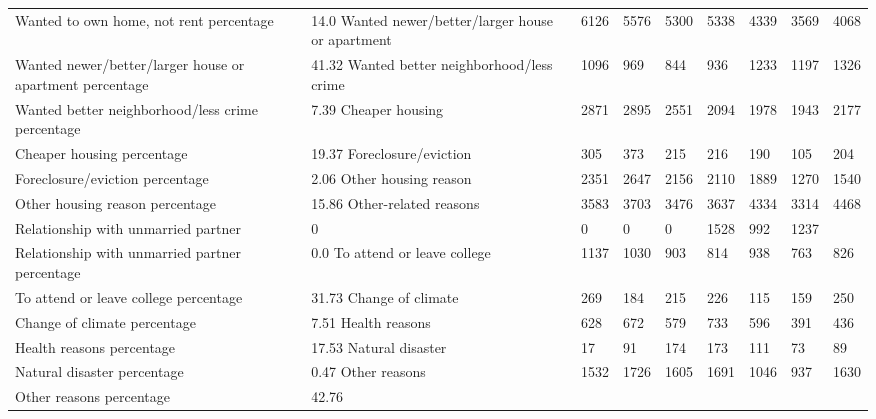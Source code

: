 \begin{tabular}{llllllll}
Wanted to own home, not rent percentage & 14.0%
Wanted newer/better/larger house or apartment & 6126 & 5576 & 5300 & 5338 & 4339 & 3569 & 4068 \\
Wanted newer/better/larger house or apartment percentage & 41.32%
Wanted better neighborhood/less crime & 1096 & 969 & 844 & 936 & 1233 & 1197 & 1326 \\
Wanted better neighborhood/less crime percentage & 7.39%
Cheaper housing & 2871 & 2895 & 2551 & 2094 & 1978 & 1943 & 2177 \\
Cheaper housing percentage & 19.37%
Foreclosure/eviction & 305 & 373 & 215 & 216 & 190 & 105 & 204 \\
Foreclosure/eviction percentage & 2.06%
Other housing reason & 2351 & 2647 & 2156 & 2110 & 1889 & 1270 & 1540 \\
Other housing reason percentage & 15.86%
Other-related reasons & 3583 & 3703 & 3476 & 3637 & 4334 & 3314 & 4468 \\
Relationship with unmarried partner & 0 & 0 & 0 & 0 & 1528 & 992 & 1237 \\
Relationship with unmarried partner percentage & 0.0%
To attend or leave college & 1137 & 1030 & 903 & 814 & 938 & 763 & 826 \\
To attend or leave college percentage & 31.73%
Change of climate & 269 & 184 & 215 & 226 & 115 & 159 & 250 \\
Change of climate percentage & 7.51%
Health reasons & 628 & 672 & 579 & 733 & 596 & 391 & 436 \\
Health reasons percentage & 17.53%
Natural disaster & 17 & 91 & 174 & 173 & 111 & 73 & 89 \\
Natural disaster percentage & 0.47%
Other reasons & 1532 & 1726 & 1605 & 1691 & 1046 & 937 & 1630 \\
Other reasons percentage & 42.76%
\bottomrule
\end{tabular}
